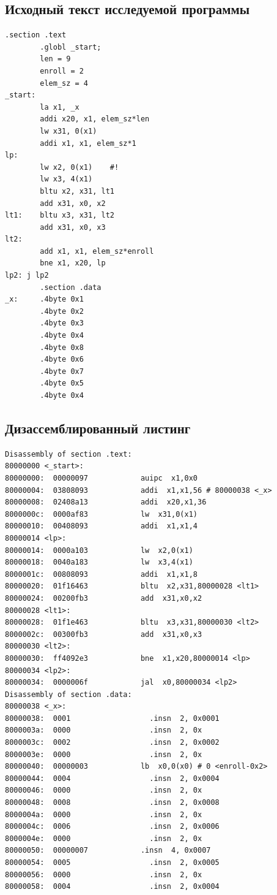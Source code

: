 \documentclass{article}
\begin{document}
\subsection{Исходный текст исследуемой программы}
\begin{lstlisting}[style=lst, caption=Исходный текст исследуемой программы]
.section .text
        .globl _start;
        len = 9 
        enroll = 2 
        elem_sz = 4
_start:
        la x1, _x
        addi x20, x1, elem_sz*len
        lw x31, 0(x1)
        addi x1, x1, elem_sz*1
lp:
        lw x2, 0(x1)    #!
        lw x3, 4(x1)
        bltu x2, x31, lt1
        add x31, x0, x2
lt1:    bltu x3, x31, lt2
        add x31, x0, x3
lt2:
        add x1, x1, elem_sz*enroll
        bne x1, x20, lp
lp2: j lp2
        .section .data
_x:     .4byte 0x1
        .4byte 0x2
        .4byte 0x3
        .4byte 0x4
        .4byte 0x8
        .4byte 0x6
        .4byte 0x7
        .4byte 0x5
        .4byte 0x4
\end{lstlisting}

\subsection{Дизассемблированный листинг}
\begin{lstlisting}[style=lst, caption=Дизассемблированный листинг программы]
Disassembly of section .text:
80000000 <_start>:
80000000:  00000097            auipc  x1,0x0
80000004:  03808093            addi  x1,x1,56 # 80000038 <_x>
80000008:  02408a13            addi  x20,x1,36
8000000c:  0000af83            lw  x31,0(x1)
80000010:  00408093            addi  x1,x1,4
80000014 <lp>:
80000014:  0000a103            lw  x2,0(x1)
80000018:  0040a183            lw  x3,4(x1)
8000001c:  00808093            addi  x1,x1,8
80000020:  01f16463            bltu  x2,x31,80000028 <lt1>
80000024:  00200fb3            add  x31,x0,x2
80000028 <lt1>:
80000028:  01f1e463            bltu  x3,x31,80000030 <lt2>
8000002c:  00300fb3            add  x31,x0,x3
80000030 <lt2>:
80000030:  ff4092e3            bne  x1,x20,80000014 <lp>
80000034 <lp2>:
80000034:  0000006f            jal  x0,80000034 <lp2>
Disassembly of section .data:
80000038 <_x>:
80000038:  0001                  .insn  2, 0x0001
8000003a:  0000                  .insn  2, 0x
8000003c:  0002                  .insn  2, 0x0002
8000003e:  0000                  .insn  2, 0x
80000040:  00000003            lb  x0,0(x0) # 0 <enroll-0x2>
80000044:  0004                  .insn  2, 0x0004
80000046:  0000                  .insn  2, 0x
80000048:  0008                  .insn  2, 0x0008
8000004a:  0000                  .insn  2, 0x
8000004c:  0006                  .insn  2, 0x0006
8000004e:  0000                  .insn  2, 0x
80000050:  00000007            .insn  4, 0x0007
80000054:  0005                  .insn  2, 0x0005
80000056:  0000                  .insn  2, 0x
80000058:  0004                  .insn  2, 0x0004
\end{lstlisting}
\end{document}
